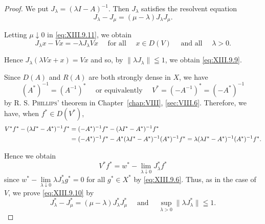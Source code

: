 \begin{proof}
 We put $J_{\lambda} = (\lambda I - A)^{-1}$. Then $J_{\lambda}$ satisfies the resolvent equation 
\begin{equation}\label{eq:XIII.9.11}
J _{\lambda} - J _{\mu} = (\mu - \lambda) J _{\lambda} J _{\mu}. \end{equation}

Letting $\mu \downarrow 0$ in \eqref{eq:XIII.9.11}, we obtain 
\begin{equation}\label{eq:XIII.9.12}
J _{\lambda} x - V x = - \lambda J _{\lambda} V x \quad \text{ for all } \quad x \in D (V) \quad \text{ and all } \quad \lambda > 0.
\end{equation}

Hence $J_{\lambda}(\lambda V x + x) = V x$ and so, by $\| \lambda J_{\lambda} \| \leqq 1$, we obtain \eqref{eq:XIII.9.9}. 

Since $D(A)$ and $R(A)$ are both strongly dense in $X$, we have 
\begin{equation}\label{eq:XIII.9.13}
(A ^{*}) ^{-1} = (A ^{-1}) ^{*} \quad \text{ or equivalently } \quad V ^{*} = (- A ^{-1}) ^{*} = (- A ^{*}) ^{-1}
\end{equation}
by R. S. \textsc{Phillips}' theorem in Chapter~\ref{chap:VIII}, \ref{sec:VIII.6}. Therefore, we have, when $f^{*} \in D(V^{*})$, 
\begin{align}
V ^{*} f ^{*} - (\lambda I ^{*} - A ^{*}) ^{-1} f ^{*}& = (- A ^{*}) ^{-1} f ^{*} - (\lambda I ^{*} - A ^{*}) ^{-1} f ^{*} \notag \\
&= (- A ^{*}) ^{-1} f ^{*} - A ^{*} (\lambda I ^{*} - A ^{*}) ^{-1} (A ^{*}) ^{-1} f ^{*} = \lambda (\lambda I ^{*} - A ^{*}) ^{-1} (A ^{*}) ^{-1} f ^{*}. \notag
\end{align}

Hence we obtain 
\begin{equation}\label{eq:XIII.9.14}
V ^{*} f ^{*} = w ^{*} - \lim\limits _{\lambda \downarrow 0} J _{\lambda} ^{*} f ^{*}
\end{equation}
since $w^{*} - \lim\limits_{\lambda \downarrow 0} \lambda J_{\lambda}^{*} g^{*} = 0$ for all $g^{*} \in X^{*}$ by \eqref{eq:XIII.9.6}. Thus, as in the case of $V$, we prove \eqref{eq:XIII.9.10} by 
\begin{equation}\tag{11'}\label{eq:XIII.9.11'}
J _{\lambda} ^{*} - J _{\mu} ^{*} = (\mu - \lambda) J _{\lambda} ^{*} J _{\mu} ^{*} \quad \text{ and } \quad \sup\limits _{\lambda > 0} \| \lambda J _{\lambda} ^{*} \| \leqq 1.
\end{equation}
\end{proof}

